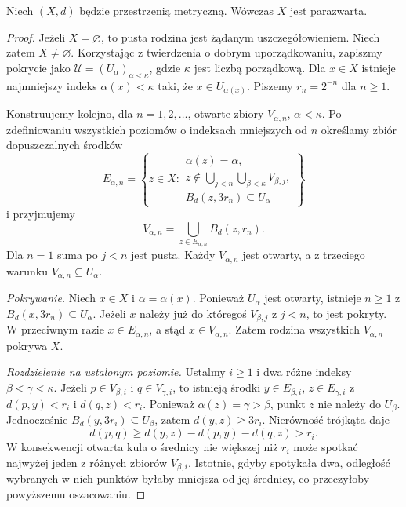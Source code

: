 \begin{twierdzenie}
\label{thm:topog-parazwartosc-stone}
Niech $(X,d)$ będzie przestrzenią metryczną.
Wówczas $X$ jest parazwarta.
\end{twierdzenie}
\begin{proof}
Jeżeli $X=\varnothing$, to pusta rodzina
jest żądanym uszczegółowieniem.
Niech zatem $X\ne\varnothing$.
Korzystając z twierdzenia o dobrym uporządkowaniu,
zapiszmy pokrycie jako
$\mathcal U=(U_\alpha)_{\alpha<\kappa}$,
gdzie $\kappa$ jest liczbą porządkową.
Dla $x\in X$ istnieje najmniejszy
indeks $\alpha(x)<\kappa$ taki, że
$x\in U_{\alpha(x)}$.
Piszemy $r_n=2^{-n}$ dla $n\ge1$.

Konstruujemy kolejno, dla $n=1,2,\ldots$,
otwarte zbiory $V_{\alpha,n}$,
$\alpha<\kappa$.
Po zdefiniowaniu wszystkich poziomów
o indeksach mniejszych od $n$ określamy
zbiór dopuszczalnych środków
\[
E_{\alpha,n}=
\left\{z\in X:
\begin{array}{l}
\alpha(z)=\alpha,\\
z\notin\displaystyle\bigcup_{j<n}
            \bigcup_{\beta<\kappa}V_{\beta,j},\\
B_d(z,3r_n)\subseteq U_\alpha
\end{array}\right\}
\]
i przyjmujemy
\[
V_{\alpha,n}=\bigcup_{z\in E_{\alpha,n}}B_d(z,r_n).
\]
Dla $n=1$ suma po $j<n$ jest pusta.
Każdy $V_{\alpha,n}$ jest otwarty,
a z trzeciego warunku
$V_{\alpha,n}\subseteq U_\alpha$.

\emph{Pokrywanie.}
Niech $x\in X$ i $\alpha=\alpha(x)$.
Ponieważ $U_\alpha$ jest otwarty,
istnieje $n\ge1$ z
$B_d(x,3r_n)\subseteq U_\alpha$.
Jeżeli $x$ należy już do któregoś
$V_{\beta,j}$ z $j<n$, to jest pokryty.
W przeciwnym razie $x\in E_{\alpha,n}$,
a stąd $x\in V_{\alpha,n}$.
Zatem rodzina wszystkich
$V_{\alpha,n}$ pokrywa $X$.

\emph{Rozdzielenie na ustalonym poziomie.}
Ustalmy $i\ge1$ i dwa różne indeksy
$\beta<\gamma<\kappa$.
Jeżeli
$p\in V_{\beta,i}$ i
$q\in V_{\gamma,i}$,
to istnieją środki
$y\in E_{\beta,i}$,
$z\in E_{\gamma,i}$
z $d(p,y)<r_i$ i $d(q,z)<r_i$.
Ponieważ $\alpha(z)=\gamma>\beta$,
punkt $z$ nie należy do $U_\beta$.
Jednocześnie
$B_d(y,3r_i)\subseteq U_\beta$,
zatem $d(y,z)\ge3r_i$.
Nierówność trójkąta daje
\[
d(p,q)\ge d(y,z)-d(p,y)-d(q,z)>r_i.
\]
W konsekwencji otwarta kula
o średnicy nie większej niż $r_i$
może spotkać najwyżej jeden
z różnych zbiorów $V_{\beta,i}$.
Istotnie, gdyby spotykała dwa,
odległość wybranych w nich punktów
byłaby mniejsza od jej średnicy,
co przeczyłoby powyższemu oszacowaniu.


\end{proof}
